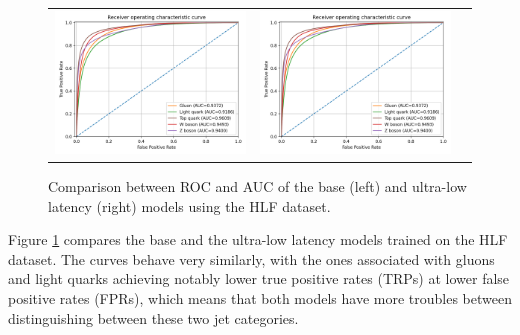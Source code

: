 \begin{figure}[!hpt]
  \centering
  \begin{tabular}{ccc}
      {\includegraphics[width=0.48\columnwidth]{../logs/ROC.png}} &
      {\includegraphics[width=0.48\columnwidth]{../logs/ROC.png}}
  \end{tabular}
  \caption{Comparison between ROC and AUC of the base (left) and ultra-low latency (right) models using the HLF dataset.}
  \label{fig:ROCs-HLF}
\end{figure}

Figure \ref{fig:ROCs-HLF} compares the base and the ultra-low latency models trained on the HLF dataset. The curves behave very similarly, with the ones associated with gluons and light quarks achieving notably lower true positive rates (TRPs) at lower false positive rates (FPRs), which means that both models have more troubles between distinguishing between these two jet categories.

